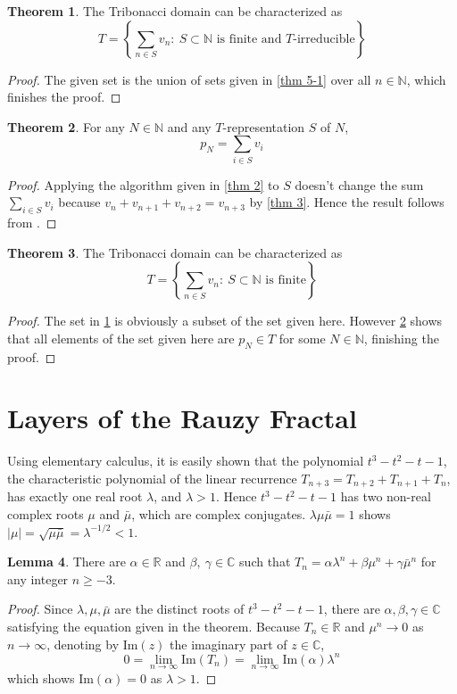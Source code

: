 \documentclass{article}
\theoremstyle{definition}
\newtheorem{theorem}{Theorem}
\newtheorem{lemma}[theorem]{Lemma}
\begin{document}
\begin{theorem}
\label{thm 5} The Tribonacci domain can be characterized as
\[ 
T = \left\{ \sum_{n\in S}v_n:\ S\subset \mathbb{N}  \text{ is finite and $T$-irreducible} \right\}
\]
\end{theorem}
\begin{proof}
The given set is the union of sets given in \cref{thm 5-1} over all $n\in \mathbb{N}$, which finishes the proof.
\end{proof}

\begin{theorem}
\label{thm 6}
For any $N\in\mathbb{N}$ and any $T$-representation $S$ of $N$, \[ p_N=\sum_{i\in S} v_i\]
\end{theorem}
\begin{proof}
Applying the algorithm given in \cref{thm 2} to $S$ doesn't change the sum $\sum_{i\in S}v_i$ because $v_n+v_{n+1}+v_{n+2}=v_{n+3}$ by \cref{thm 3}. Hence the result follows from . 
\end{proof}

\begin{theorem}
\label{thm 7}
The Tribonacci domain can be characterized as
\[ T = \left\{ \sum_{n\in S}v_n:\ S\subset \mathbb{N}  \text{ is finite}\right\}\]
\end{theorem}
\begin{proof}
The set in \cref{thm 5} is obviously a subset of the set given here. However \cref{thm 6} shows that all elements of the set given here are $p_N\in T$ for some $N\in \mathbb{N}$, finishing the proof.
\end{proof}


\section{Layers of the Rauzy Fractal}

Using elementary calculus, it is easily shown that the polynomial $t^3-t^2-t-1$, the characteristic polynomial of the linear recurrence $T_{n+3}=T_{n+2}+T_{n+1}+T_n$, has exactly one real root $\lambda$, and $\lambda >1$. Hence $t^3-t^2-t-1$ has two non-real complex roots $\mu$ and $\bar\mu$, which are complex conjugates. $\lambda\mu\bar{\mu}=1$ shows $|\mu|=\sqrt{\mu\bar{\mu}}=\lambda^{-1/2}<1$. 

\begin{lemma}
\label{thm 8-0}
There are $\alpha\in\mathbb{R}$ and $\beta, \ \gamma\in \mathbb{C}$ such that $T_n=\alpha\lambda^n+\beta\mu^n+\gamma \bar{\mu}^n$ for any integer $n\geq -3$.
\end{lemma}
\begin{proof}
Since $\lambda, \mu, \bar{\mu}$ are the distinct roots of $t^3-t^2-t-1$, there are $\alpha, \beta, \gamma\in\mathbb{C}$ satisfying the equation given in the theorem. Because $T_n\in\mathbb{R}$ and $\mu^n\rightarrow0$ as $n\rightarrow\infty$, denoting by $\text{Im}(z)$ the imaginary part of $z\in\mathbb{C}$,
 \[
0=\lim_{n\rightarrow\infty} \text{Im}(T_n)= \lim_{n\rightarrow\infty}\text{Im}(\alpha)\lambda^n
\]
which shows $\text{Im}(\alpha)=0$ as $\lambda>1$.
\end{proof}
\end{document}
